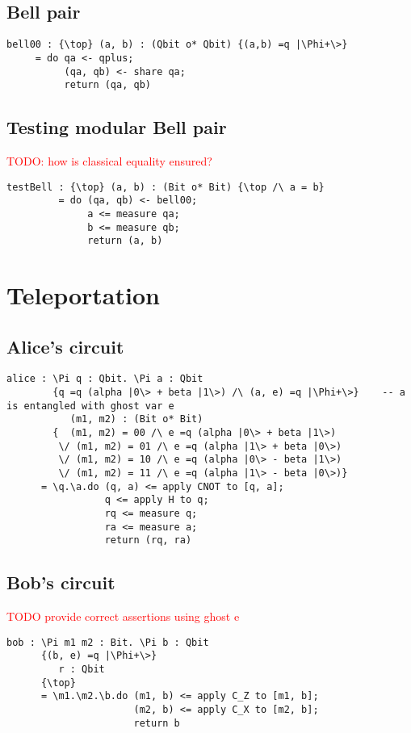 \documentclass[acmsmall,nonacm,timestamp,review=false,anonymous=false]{acmart}
\newcommand{\todo}[1]{\textcolor{red}{#1}}
\begin{document}
\subsection{Bell pair}
\begin{lstlisting}[language=QHaskell]
bell00 : {\top} (a, b) : (Qbit o* Qbit) {(a,b) =q |\Phi+\>}
     = do qa <- qplus;
          (qa, qb) <- share qa;
          return (qa, qb)
\end{lstlisting}

\subsection{Testing modular Bell pair}
\todo{TODO: how is classical equality ensured?}
\begin{lstlisting}[language=QHaskell]
testBell : {\top} (a, b) : (Bit o* Bit) {\top /\ a = b}
         = do (qa, qb) <- bell00;
              a <= measure qa;
              b <= measure qb;
              return (a, b)
\end{lstlisting}

\section{Teleportation}
\label{app:teleport}
\subsection{Alice's circuit}
\begin{lstlisting}[language=QHaskell]
alice : \Pi q : Qbit. \Pi a : Qbit
        {q =q (alpha |0\> + beta |1\>) /\ (a, e) =q |\Phi+\>}    -- a is entangled with ghost var e
           (m1, m2) : (Bit o* Bit)
        {  (m1, m2) = 00 /\ e =q (alpha |0\> + beta |1\>)
         \/ (m1, m2) = 01 /\ e =q (alpha |1\> + beta |0\>)
         \/ (m1, m2) = 10 /\ e =q (alpha |0\> - beta |1\>)
         \/ (m1, m2) = 11 /\ e =q (alpha |1\> - beta |0\>)}
      = \q.\a.do (q, a) <= apply CNOT to [q, a];
                 q <= apply H to q;
                 rq <= measure q;
                 ra <= measure a;
                 return (rq, ra)
\end{lstlisting}

\subsection{Bob's circuit}
\todo{TODO provide correct assertions using ghost e}
\begin{lstlisting}[language=QHaskell]
bob : \Pi m1 m2 : Bit. \Pi b : Qbit
      {(b, e) =q |\Phi+\>}
         r : Qbit
      {\top}
      = \m1.\m2.\b.do (m1, b) <= apply C_Z to [m1, b];
                      (m2, b) <= apply C_X to [m2, b];
                      return b
\end{lstlisting}
\end{document}
